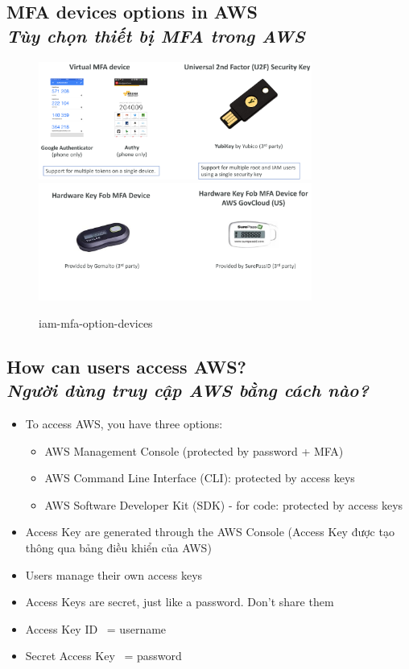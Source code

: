 \newpage

\subsection[MFA devices options in AWS]{MFA devices options in AWS \\ \textit{Tùy chọn thiết bị MFA trong AWS}}


\begin{figure}[htbp]
	\centering
	\includegraphics[width=0.8\textwidth]{images/iam-mfa-option-devices}
		\includegraphics[width=0.8\textwidth]{images/iam-mfa-option-devices-02}
	\caption{iam-mfa-option-devices}
	\label{fig:iam-mfa-option-devices}
\end{figure}

\subsection[How can users access AWS?]{How can users access AWS? \\ \textit{Người dùng truy cập AWS bằng cách nào?}}

\begin{itemize}
	\item To access AWS, you have three options:
	\begin{itemize}
		\item AWS Management Console (protected by password + MFA)
		\item AWS Command Line Interface (CLI): protected by access keys
		\item AWS Software Developer Kit (SDK) - for code: protected by access keys
	\end{itemize}
	\item Access Key are generated through the AWS Console (Access Key được tạo thông qua bảng điều khiển của AWS)
	\item Users manage their own access keys
	\item Access Keys are secret, just like a password. Don't share them
	\item Access Key ID ~= username
	\item Secret Access Key ~= password
\end{itemize}


